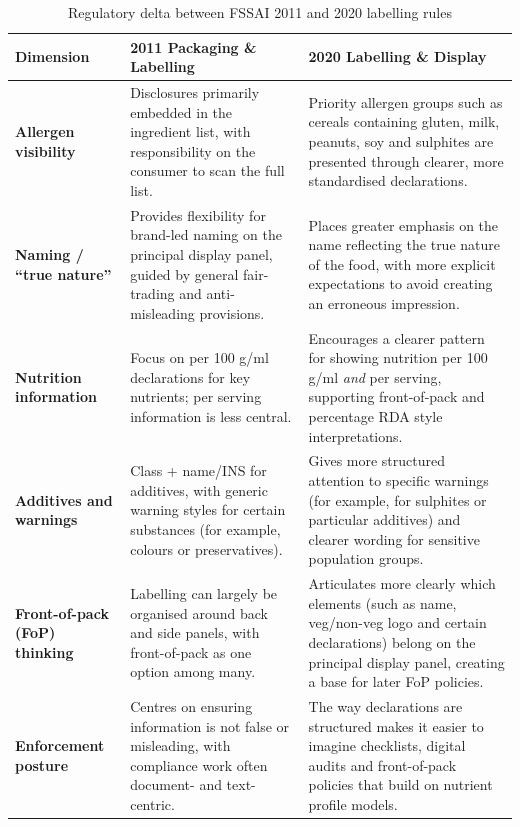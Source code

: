 \documentclass[12pt,a4paper]{article}
\begin{document}
\begin{table}[!ht]
  \centering
  \caption{Regulatory delta between FSSAI 2011 and 2020 labelling rules}
  \label{tab:delta}
  \begin{tabular}{p{4.0cm} p{5cm} p{6cm}}
    \toprule
    \textbf{Dimension} & \textbf{2011 Packaging \& Labelling} & \textbf{2020 Labelling \& Display} \\
    \midrule
    \textbf{Allergen visibility}
      & Disclosures primarily embedded in the ingredient list, with responsibility on the consumer to scan the full list.
      & Priority allergen groups such as cereals containing gluten, milk, peanuts, soy and sulphites are presented through clearer, more standardised declarations. \\
    \textbf{Naming / ``true nature''}
      & Provides flexibility for brand-led naming on the principal display panel, guided by general fair-trading and anti-misleading provisions.
      & Places greater emphasis on the name reflecting the true nature of the food, with more explicit expectations to avoid creating an erroneous impression. \\
    \textbf{Nutrition information}
      & Focus on per 100 g/ml declarations for key nutrients; per serving information is less central.
      & Encourages a clearer pattern for showing nutrition per 100 g/ml \emph{and} per serving, supporting front-of-pack and percentage RDA style interpretations. \\
    \textbf{Additives and warnings}
      & Class + name/INS for additives, with generic warning styles for certain substances (for example, colours or preservatives).
      & Gives more structured attention to specific warnings (for example, for sulphites or particular additives) and clearer wording for sensitive population groups. \\
    \textbf{Front-of-pack (FoP) thinking}
      & Labelling can largely be organised around back and side panels, with front-of-pack as one option among many.
      & Articulates more clearly which elements (such as name, veg/non-veg logo and certain declarations) belong on the principal display panel, creating a base for later FoP policies. \\
    \textbf{Enforcement posture}
      & Centres on ensuring information is not false or misleading, with compliance work often document- and text-centric.
      & The way declarations are structured makes it easier to imagine checklists, digital audits and front-of-pack policies that build on nutrient profile models. \\
    \bottomrule
  \end{tabular}
\end{table}
\end{document}
